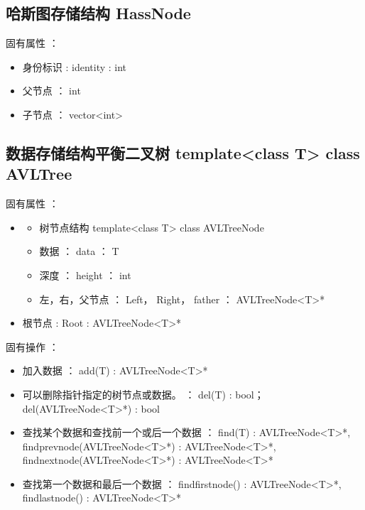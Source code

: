 \documentclass[a4paper]{book}
\numberwithin{equation}{chapter}
\theoremstyle{definition}
\begin{document}
\subsection{哈斯图存储结构 HassNode}
固有属性 ：
\begin{itemize}
	\item  身份标识 : identity : int
	\item  父节点 ： int
	\item  子节点 ： vector<int> 
\end{itemize}
\subsection{数据存储结构平衡二叉树  template<class T> class AVLTree}
固有属性 ：
\begin{itemize}
	\item  \begin{itemize}
		\item  树节点结构 template<class T> class AVLTreeNode
		\item  数据  ： data ： T
		\item  深度  ： height ： int
		\item  左，右，父节点 ： Left， Right， father ： AVLTreeNode<T>*
	\end{itemize}
    \item  根节点  : Root : AVLTreeNode<T>*
\end{itemize}
固有操作 ：
\begin{itemize}
	\item  加入数据  ： add(T) : AVLTreeNode<T>*
	\item  可以删除指针指定的树节点或数据。 ： del(T) : bool； del(AVLTreeNode<T>*) : bool
	\item  查找某个数据和查找前一个或后一个数据  ： find(T) : AVLTreeNode<T>*, 
	findprevnode(AVLTreeNode<T>*) : AVLTreeNode<T>*, findnextnode(AVLTreeNode<T>*) : AVLTreeNode<T>*
	\item  查找第一个数据和最后一个数据  ： findfirstnode() : AVLTreeNode<T>*, 
	findlastnode() : AVLTreeNode<T>*
\end{itemize}
\end{document}
